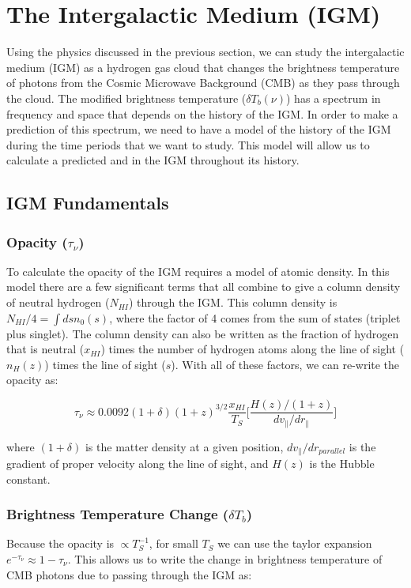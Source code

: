 \section{The Intergalactic Medium (IGM)}\label{Sec:IGM}
Using the physics discussed in the previous section, we can study the intergalactic medium (IGM) as a hydrogen gas cloud that changes the brightness temperature of photons from the Cosmic Microwave Background (CMB) as they pass through the cloud. The modified brightness temperature ($\delta T_b (\nu)$) has a spectrum in frequency and space that depends on the history of the IGM. In order to make a prediction of this spectrum, we need to have a model of the history of the IGM during the time periods that we want to study. This model will allow us to calculate a predicted \ts and \tu in the IGM throughout its history. 

\subsection{IGM Fundamentals}
\subsubsection{Opacity ($\tau_\nu$)}
To calculate the opacity of the IGM requires a model of atomic density. In this model there are a few significant terms that all combine to give a column density of neutral hydrogen ($N_{HI}$) through the IGM. This column density is $N_{HI}/4 = \int ds n_0 (s)$, where the factor of 4 comes from the sum of states (triplet plus singlet). The column density can also be written as the fraction of hydrogen that is neutral ($x_{HI}$) times the number of hydrogen atoms along the line of sight ($n_H (z)$) times the line of sight ($s$). With all of these factors, we can re-write the opacity as:

\begin{equation}
\tau_{\nu} \approx 0.0092 (1+\delta) (1+z)^{3/2} \frac{x_{HI}}{T_S} \big[ \frac{H(z)/(1+z)}{dv_{\parallel}/dr_{\parallel}} \big]
\end{equation} 

where $(1+\delta)$ is the matter density at a given position, $dv_{\parallel}/dr_{parallel}$ is the gradient of proper velocity along the line of sight, and $H(z)$ is the Hubble constant. 

\subsubsection{Brightness Temperature Change ($\delta T_b$)}
Because the opacity is $\propto T^{-1}_S$, for small $T_S$ we can use the taylor expansion $e^{-\tau_\nu} \approx 1-\tau_\nu$. This allows us to write the change in brightness temperature of CMB photons due to passing through the IGM as:

